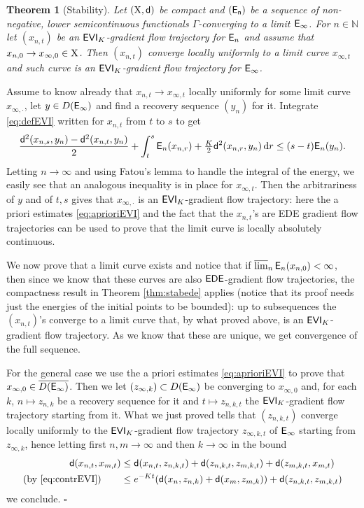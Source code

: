 \documentclass[11pt]{article}
\numberwithin{equation}{section}
\newtheorem{theorem}{Theorem}[section]
\newenvironment{idea}{\removelastskip\par\medskip   %
\noindent{\em Idea of the proof} \rm}{\penalty-20\null\hfill$\square$\par\medbreak}
\newcommand{\N}{\mathbb{N}}
\newcommand{\X}{{\rm X}}
\newcommand{\sfd}{{\sf d}}
\renewcommand{\d}{{\rm d}}
\newcommand{\lims}{\varlimsup}
\newcommand{\E}{{\sf E}} %
\newcommand{\EDE}{{\sf EDE}}
\newcommand{\EVI}{{\sf EVI}}
\begin{document}
\begin{theorem}[Stability]\label{thm:stabevi} Let $(\X,\sfd)$ be compact and  $({\sf E_n})$ be a sequence of non-negative, lower semicontinuous functionals $\Gamma$-converging to a limit $\E_\infty$. For $n\in\N$ let $(x_{n,t})$  be an $\EVI_K$-gradient flow trajectory for $\E_n$ and assume that $x_{n,0}\to x_{\infty,0}\in\X$. Then $(x_{n,t})$ converge locally uniformly to a limit curve $x_{\infty,t}$ and such curve is an $\EVI_K$-gradient flow trajectory for $\E_\infty$.
\end{theorem}
\begin{idea}  Assume to know already that $x_{n,t}\to x_{\infty,t}$ locally uniformly for some limit curve $x_{\infty,\cdot}$, let $y\in D(\E_\infty)$  and find a recovery sequence $(y_n)$ for it. Integrate \eqref{eq:defEVI} written for $x_{n,t}$ from $t$ to $s$ to get
\[
\frac{\sfd^2(x_{n,s},y_n)-\sfd^2(x_{n,t},y_n)}{2}+\int_t^s\E_n(x_{n,r})+\tfrac K2\sfd^2(x_{n,r},y_n)\,\d r\leq (s-t)\E_n(y_n).
\]
Letting $n\to\infty$ and using Fatou's lemma to handle the integral of the energy, we easily see that an analogous inequality is in place for $x_{\infty,t}$. Then the arbitrariness of $y$ and of $t,s$ gives that $x_{\infty,\cdot}$ is an $\EVI_K$-gradient flow trajectory: here the a priori estimates \eqref{eq:aprioriEVI} and the fact that the $x_{n,t}$'s are EDE gradient flow trajectories can be used to prove that the limit curve is locally absolutely continuous.

We now  prove that a limit curve exists and notice that if $\lims_n\E_n(x_{n,0})<\infty$, then since we know that these curves are also $\EDE$-gradient flow trajectories,  the compactness result in Theorem \ref{thm:stabede} applies (notice that its proof  needs just the energies of the initial points to be bounded): up to subsequences the $(x_{n,t})$'s converge to a limit curve that, by what proved above, is an $\EVI_K$-gradient flow trajectory. As we know that these are unique, we get convergence of the full sequence.

For the general case we use the a priori estimates \eqref{eq:aprioriEVI} to prove that $x_{\infty,0}\in \overline{D(\E_\infty)}$. Then we let $(z_{\infty,k})\subset D(\E_\infty)$ be converging to $x_{\infty,0}$ and, for each $k$, $n\mapsto z_{n,k}$ be a recovery sequence for it and $t\mapsto z_{n,k,t}$ the $\EVI_K$-gradient flow trajectory starting from it. What we just proved tells that $(z_{n,k,t})$ converge locally uniformly to the $\EVI_K$-gradient flow trajectory $z_{\infty,k,t}$ of $\E_\infty$ starting from $z_{\infty,k}$, hence letting first $n,m\to\infty$ and then $k\to\infty$ in the bound
\[
\begin{split}
\sfd(x_{n,t},x_{m,t})&\leq \sfd(x_{n,t},z_{n,k,t})+\sfd(z_{n,k,t},z_{m,k,t})+\sfd(z_{m,k,t},x_{m,t})\\
\text{(by \eqref{eq:contrEVI})}\qquad &\leq e^{-Kt}( \sfd(x_{n},z_{n,k})+\sfd(x_{m},z_{m,k}))+\sfd(z_{n,k,t},z_{m,k,t})\\
\end{split}
\]
we conclude.
\end{idea}
\end{document}
